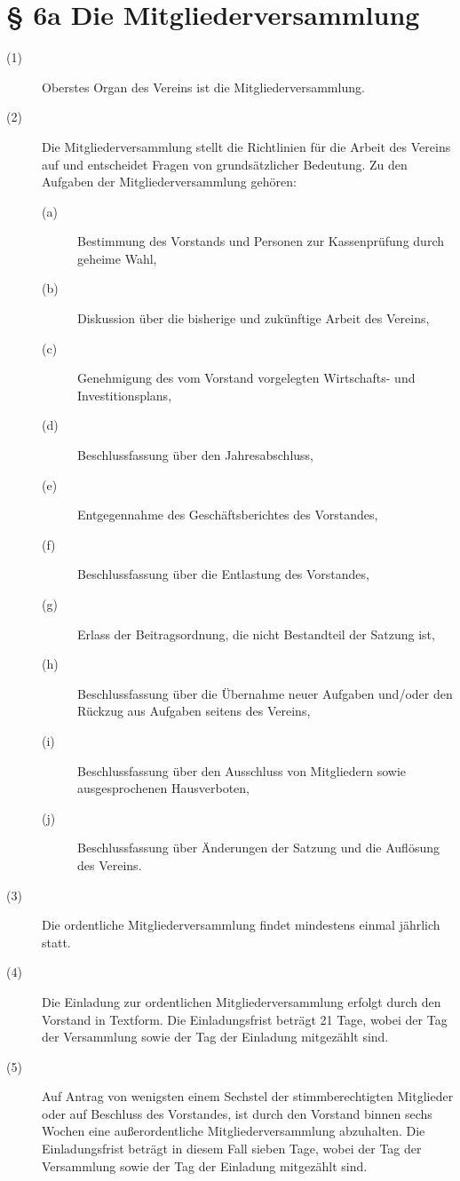\documentclass[a4paper,12pt]{scrartcl}
\begin{document}
\section*{\S{} 6a Die Mitgliederversammlung}
\begin{description} 

\item[(1)] Oberstes Organ des Vereins ist die Mitgliederversammlung.
\item[(2)] Die Mitgliederversammlung stellt die Richtlinien für die Arbeit des Vereins auf und entscheidet Fragen von grundsätzlicher Bedeutung. Zu den Aufgaben der Mitgliederversammlung gehören:
\begin{description} 
\item[(a)] Bestimmung des Vorstands und Personen zur Kassenprüfung durch geheime Wahl,
\item[(b)] Diskussion über die bisherige und zukünftige Arbeit des Vereins,
\item[(c)] Genehmigung des vom Vorstand vorgelegten Wirtschafts- und Investitionsplans,
\item[(d)] Beschlussfassung über den Jahresabschluss,
\item[(e)] Entgegennahme des Geschäftsberichtes des Vorstandes,
\item[(f)] Beschlussfassung über die Entlastung des Vorstandes,
\item[(g)] Erlass der Beitragsordnung, die nicht Bestandteil der Satzung ist,
\item[(h)] Beschlussfassung über die Übernahme neuer Aufgaben und/oder den Rückzug aus Aufgaben seitens des Vereins,
\item[(i)] Beschlussfassung über den Ausschluss von Mitgliedern sowie ausgesprochenen Hausverboten,
\item[(j)] Beschlussfassung über Änderungen der Satzung und die Auflösung des Vereins.
\end{description}
\item[(3)] Die ordentliche Mitgliederversammlung findet mindestens einmal jährlich statt.
\item[(4)] Die Einladung zur ordentlichen Mitgliederversammlung erfolgt durch den Vorstand in Textform. Die Einladungsfrist beträgt 21 Tage, wobei der Tag der Versammlung sowie der Tag der Einladung mitgezählt sind.
\item[(5)] Auf Antrag von wenigsten einem Sechstel der stimmberechtigten Mitglieder oder auf Beschluss des Vorstandes, ist durch den Vorstand binnen sechs Wochen eine außerordentliche Mitgliederversammlung abzuhalten. Die Einladungsfrist beträgt in diesem Fall sieben Tage, wobei der Tag der Versammlung sowie der Tag der Einladung mitgezählt sind.

\end{description}
\end{document}
